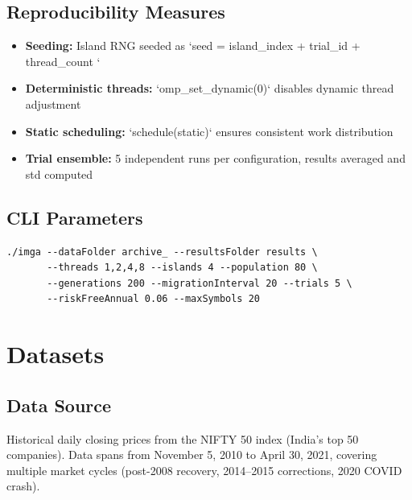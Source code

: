 \documentclass[12pt,a4paper]{article}
\begin{document}
\subsection{Reproducibility Measures}

\begin{itemize}
	\item \textbf{Seeding:} Island RNG seeded as `seed = island\_index + trial\_id  + thread\_count `
	\item \textbf{Deterministic threads:} `omp\_set\_dynamic(0)` disables dynamic thread adjustment
	\item \textbf{Static scheduling:} `schedule(static)` ensures consistent work distribution
	\item \textbf{Trial ensemble:} 5 independent runs per configuration, results averaged and std computed
\end{itemize}

\subsection{CLI Parameters}

\begin{verbatim}
./imga --dataFolder archive_ --resultsFolder results \
       --threads 1,2,4,8 --islands 4 --population 80 \
       --generations 200 --migrationInterval 20 --trials 5 \
       --riskFreeAnnual 0.06 --maxSymbols 20
\end{verbatim}

\newpage
\section{Datasets}

\subsection{Data Source}

Historical daily closing prices from the NIFTY 50 index (India's top 50 companies). Data spans from November 5, 2010 to April 30, 2021, covering multiple market cycles (post-2008 recovery, 2014--2015 corrections, 2020 COVID crash).
\end{document}
